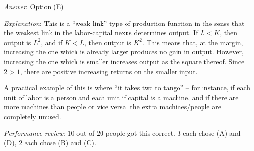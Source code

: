 \documentclass[10pt]{amsart}
\begin{document}
\begin{enumerate}
  {\em Answer}: Option (E)

  {\em Explanation}: This is a ``weak link'' type of production
  function in the sense that the weakest link in the labor-capital
  nexus determines output. If $L < K$, then output is $L^2$, and if $K
  < L$, then output is $K^2$. This means that, at the margin,
  increasing the one which is already larger produces no gain in
  output. However, increasing the one which is smaller increases
  output as the square thereof. Since $2 > 1$, there are positive
  increasing returns on the smaller input.

  A practical example of this is where ``it takes two to tango'' --
  for instance, if each unit of labor is a person and each unit if
  capital is a machine, and if there are more machines than people or
  vice versa, the extra machines/people are completely unused.

  {\em Performance review}: $10$ out of $20$ people got this
  correct. $3$ each chose (A) and (D), $2$ each chose (B) and (C).
\end{enumerate}
\end{document}
